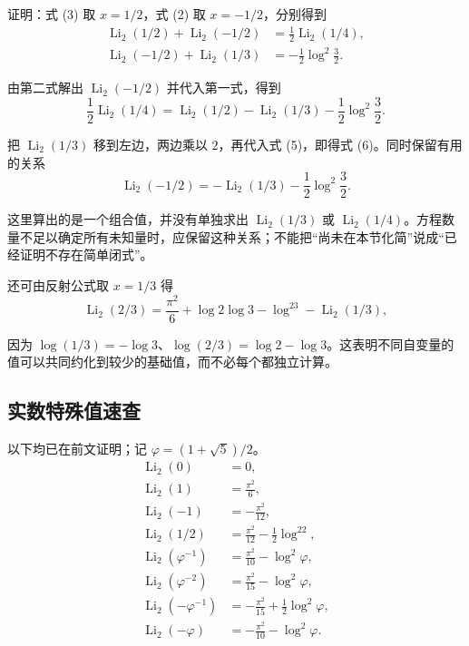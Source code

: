 \documentclass[11pt,a4paper]{article}
\begin{document}
证明：式 (3) 取 \(x=1/2\)，式 (2) 取 \(x=-1/2\)，分别得到
\[
\begin{aligned}
\operatorname{Li}_2(1/2)+\operatorname{Li}_2(-1/2)
&=\frac12\operatorname{Li}_2(1/4),\\
\operatorname{Li}_2(-1/2)+\operatorname{Li}_2(1/3)
&=-\frac12\log^2\!\frac32.
\end{aligned}
\]

由第二式解出 \(\operatorname{Li}_2(-1/2)\) 并代入第一式，得到
\[
\frac12\operatorname{Li}_2(1/4)
=\operatorname{Li}_2(1/2)-\operatorname{Li}_2(1/3)
-\frac12\log^2\!\frac32.
\]

把 \(\operatorname{Li}_2(1/3)\) 移到左边，两边乘以 \(2\)，再代入式
(5)，即得式 (6)。同时保留有用的关系
\[
\operatorname{Li}_2(-1/2)=-\operatorname{Li}_2(1/3)-\frac12\log^2\!\frac32.
\]

这里算出的是一个组合值，并没有单独求出 \(\operatorname{Li}_2(1/3)\) 或
\(\operatorname{Li}_2(1/4)\)。方程数量不足以确定所有未知量时，应保留这种关系；不能把``尚未在本节化简''说成``已经证明不存在简单闭式''。

还可由反射公式取 \(x=1/3\) 得
\[
\operatorname{Li}_2(2/3)=\frac{\pi^2}{6}
+\log2\log3-\log^23-\operatorname{Li}_2(1/3),
\]

因为
\(\log(1/3)=-\log3\)、\(\log(2/3)=\log2-\log3\)。这表明不同自变量的值可以共同约化到较少的基础值，而不必每个都独立计算。

\hypertarget{ux5b9eux6570ux7279ux6b8aux503cux901fux67e5}{%
\subsection{实数特殊值速查}\label{ux5b9eux6570ux7279ux6b8aux503cux901fux67e5}}

以下均已在前文证明；记 \(\varphi=(1+\sqrt5)/2\)。
\[
\begin{aligned}
\operatorname{Li}_2(0)&=0,\\
\operatorname{Li}_2(1)&=\frac{\pi^2}{6},\\
\operatorname{Li}_2(-1)&=-\frac{\pi^2}{12},\\
\operatorname{Li}_2(1/2)&=\frac{\pi^2}{12}-\frac12\log^22,\\
\operatorname{Li}_2(\varphi^{-1})&=\frac{\pi^2}{10}-\log^2\varphi,\\
\operatorname{Li}_2(\varphi^{-2})&=\frac{\pi^2}{15}-\log^2\varphi,\\
\operatorname{Li}_2(-\varphi^{-1})&=-\frac{\pi^2}{15}+\frac12\log^2\varphi,\\
\operatorname{Li}_2(-\varphi)&=-\frac{\pi^2}{10}-\log^2\varphi.
\end{aligned}
\]
\end{document}
